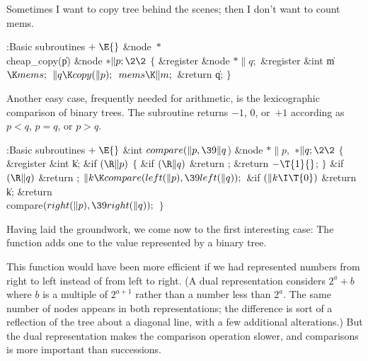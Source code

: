 Sometimes I want to copy tree behind the scenes; then I
don't want to
count mems.

\Y\B\4:Basic subroutines\X${}\mathrel+\E{}$\6
\&{node} ${}{*}{}$\\{cheap\_copy}(\|p)\1\1\6
\&{node} ${}{*}\|p;\2\2{}$\6
${}\{{}$\1\6
\&{register} \&{node} ${}{*}\|q;{}$\6
\&{register} \&{int} \|m${}\K\\{mems};{}$\7
${}\|q\K\\{copy}(\|p);{}$\6
${}\\{mems}\K\|m;{}$\6
\&{return} \|q;\6
\4${}\}{}$\2\par
\fi

Another easy case, frequently needed for arithmetic, is the
lexicographic comparison of binary trees. The  subroutine
returns $-1$, $0$, or~$+1$ according as $p<q$, $p=q$, or $p>q$.

\Y\B\4:Basic subroutines\X${}\mathrel+\E{}$\6
\&{int} ${}\\{compare}(\|p,\39\|q{}$)\1%
\1\6
\&{node} ${}{*}\|p,{}$ ${}{*}\|q;\2\2{}$\6
${}\{{}$\1\6
\&{register} \&{int} \|k;\7
\&{if} ${}(\R\|p){}$\5
${}\{{}$\1\6
\&{if} ${}(\R\|q){}$\1\5
\&{return} ;\2\6
\&{return} ${}{-}\T{1}{}$;\6
\4${}\}{}$\2\6
\&{if} ${}(\R\|q){}$\1\5
\&{return} ;\2\6
${}\|k\K\\{compare}(\\{left}(\|p),\39\\{left}(\|q));{}$\6
\&{if} ${}(\|k\I\T{0}){}$\1\5
\&{return} \|k;\2\6
\&{return} \\{compare}${}(\\{right}(\|p),\39\\{right}(\|q));{}$\6
\4${}\}{}$\2\par
\fi

Having laid the groundwork, we come now to the first
interesting case:
The  function adds one to the value represented by a binary tree.

This function would have been more efficient if we had represented
numbers from right to left instead of from left to right. (A dual
representation considers $2^a+b$ where $b$ is a multiple of $2^{a+1}$
rather than a number less than $2^a$. The same number of nodes appears
in both representations; the difference is sort of a reflection
of the tree about a diagonal line, with a few additional alterations.)
But the dual representation makes the comparison operation slower, and
comparisons is more important than successions.

